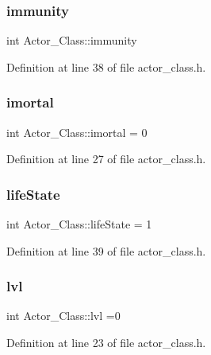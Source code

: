 \subsubsection{\texorpdfstring{immunity}{immunity}}
{\footnotesize\ttfamily int Actor\+\_\+\+Class\+::immunity}



Definition at line 38 of file actor\+\_\+class.\+h.

\hypertarget{class_actor___class_a9ab84f0fcab1c04e088db17d41c9dbf8}{}\label{class_actor___class_a9ab84f0fcab1c04e088db17d41c9dbf8} 
\subsubsection{\texorpdfstring{imortal}{imortal}}
{\footnotesize\ttfamily int Actor\+\_\+\+Class\+::imortal = 0}



Definition at line 27 of file actor\+\_\+class.\+h.

\hypertarget{class_actor___class_ac71f1b0f8ee1403bc8ce8b5da823e2e6}{}\label{class_actor___class_ac71f1b0f8ee1403bc8ce8b5da823e2e6} 
\subsubsection{\texorpdfstring{life\+State}{lifeState}}
{\footnotesize\ttfamily int Actor\+\_\+\+Class\+::life\+State = 1}



Definition at line 39 of file actor\+\_\+class.\+h.

\hypertarget{class_actor___class_acab5d3dc2a8623644b54d446b093cc7f}{}\label{class_actor___class_acab5d3dc2a8623644b54d446b093cc7f} 
\subsubsection{\texorpdfstring{lvl}{lvl}}
{\footnotesize\ttfamily int Actor\+\_\+\+Class\+::lvl =0}



Definition at line 23 of file actor\+\_\+class.\+h.

\hypertarget{class_actor___class_adbd0ae08bc516686efb88230183168c7}{}\label{class_actor___class_adbd0ae08bc516686efb88230183168c7} 
